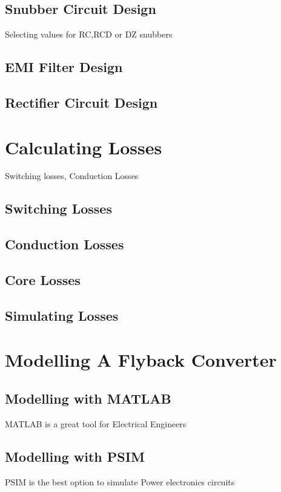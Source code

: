 \documentclass{article}
\begin{document}
\subsection[Snubber Circuit Design]{Snubber Circuit Design}
Selecting values for RC,RCD or DZ snubbers

\subsection[EMI Filter Design]{EMI Filter Design}

\subsection[Rectifier Circuit Design]{Rectifier Circuit Design}

\section[Calculating Losses]{Calculating Losses}
Switching losses, Conduction Losses
\subsection[Switching Losses]{Switching Losses}
\subsection[Conduction Losses]{Conduction Losses}
\subsection[Core Losses]{Core Losses}
\subsection[Simulating Losses]{Simulating Losses}

\section[Modelling]{Modelling A Flyback Converter}
\subsection[Modelling with MATLAB ]{Modelling with MATLAB}

MATLAB is a great tool for Electrical Engineers

\subsection[Modelling with PSIM]{Modelling with PSIM}
PSIM is the best option to simulate Power electronics circuits
\end{document}
